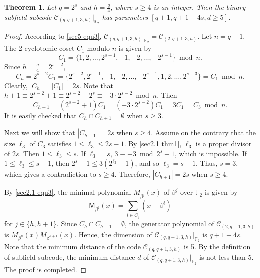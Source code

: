 \documentclass[sn-mathphys-num]{sn-jnl}%
\theoremstyle{thmstyleone}%
\newtheorem{theorem}{Theorem}%
\theoremstyle{thmstyletwo}%
\theoremstyle{thmstylethree}%
\begin{document}
\begin{theorem}\label{sec5 thm1}
	Let $q=2^s$ and $h=\frac{q}{4}$, where $s\ge 4$ is an integer. Then the binary subfield subcode $\mathcal{C}_{(q,q+1,3,h)}|_{\mathbb{F}_{2}}$ has parameters $[q+1,q+1-4s,d\ge5]$.
\end{theorem}
\begin{proof}
	According to \cref{sec5 equ3}, $\mathcal{C}_{(q,q+1,3,h)}|_{\mathbb{F}_{2}}=\mathcal{C}_{(2,q+1,3,h)}$. Let $n=q+1$. The 2-cyclotomic coset $C_1$ modulo $n$ is given by
	\begin{equation*}
		C_1=\{1,2,\ldots,2^{s-1},-1,-2,\ldots,-2^{s-1}\}\bmod n.
	\end{equation*}
	Since $h=\frac{q}{4}=2^{s-2}$,
	\begin{equation*}
		C_h=2^{s-2}C_1=\{2^{s-2},2^{s-1},-1,-2,\dots,-2^{s-1},1,2,\ldots,2^{s-3}\}=C_1\bmod n.
	\end{equation*}
	Clearly, $|C_h|=|C_1|=2s$. Note that $h+1 \equiv 2^{s-2}+1 \equiv 2^{s-2}-2^s \equiv -3\cdot2^{s-2} \bmod n$. Then
	\begin{equation*}
		C_{h+1}=(2^{s-2}+1)C_1=(-3\cdot2^{s-2})C_1=3C_1=C_3\bmod n.
	\end{equation*}
	It is easily checked that $C_h \cap C_{h+1} =\emptyset$ when $s\ge3$. 
	
	Next we will show that $|C_{h+1}|=2s$ when $s\ge4$. Assume on the contrary that the size $\ell_{3}$ of $C_{3}$ satisfies $1\le \ell_{3}\le 2s-1$. By \cref{sec2.1 thm1}, $\ell_3$ is a proper divisor of $2s$. Then $1\le \ell_3 \le s$. If $\ell_3=s$, $3\equiv-3\bmod 2^s+1$, which is impossible. If $1\le \ell_{3}\le s-1$, then $2^s+1\le 3(2^{\ell_{3}}-1)$, and so $\ell_{3}=s-1$. Thus, $s=3$, which gives a contradiction to $s\ge 4$. Therefore, $|C_{h+1}|=2s$ when $s\ge4$.
	
	By \cref{sec2.1 equ3}, the minimal polynomial $M_{\beta^j}(x)$ of $\beta^j$ over $\mathbb{F}_2$ is given by
	\begin{equation*}
		\mathsf M_{\beta^j}(x)=\sum_{i\in C_j}(x-\beta^i)
	\end{equation*}
	for $j\in \{h, h+1\}$. Since $C_h \cap C_{h+1} =\emptyset$, the generator polynomial of $\mathcal{C}_{(2,q+1,3,h)}$ is $M_{\beta^h}(x)M_{\beta^{h+1}}(x)$. Hence, the dimension of $\mathcal{C}_{(q,q+1,3,h)}|_{\mathbb{F}_{2}}$ is $q+1-4s$. Note that the minimum distance of the code $\mathcal{C}_{(q,q+1,3,h)}$ is 5. By the definition of subfield subcode, the minimum distance $d$ of $\mathcal{C}_{(q,q+1,3,h)}|_{\mathbb{F}_{2}}$ is not less than 5. The proof is completed.
\end{proof}
\end{document}
